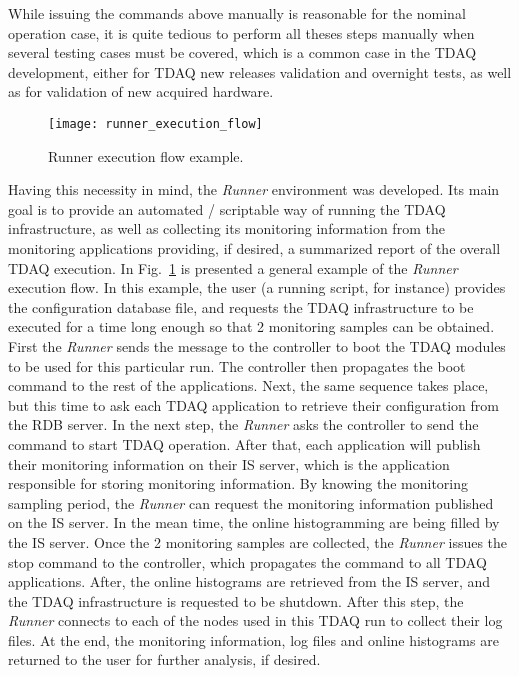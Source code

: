 While issuing the commands above manually is reasonable for the nominal operation case, it is quite tedious to perform all theses steps manually when several testing cases must be covered, which is a common case in the TDAQ development, either for TDAQ new releases validation and overnight tests, as well as for validation of new acquired hardware.

\begin{figure}
\begin{center}
\texttt{[image: runner\_execution\_flow]}
\end{center}
\caption{Runner execution flow example.}
\label{fig:runner_exec_flow}
\end{figure}

Having this necessity in mind, the \emph{Runner} environment was developed. Its main goal is to provide an automated / scriptable way of running the TDAQ infrastructure, as well as collecting its monitoring information from the monitoring applications providing, if desired, a summarized report of the overall TDAQ execution. In Fig.~\ref{fig:runner_exec_flow} is presented a general example of the \emph{Runner} execution flow. In this example, the user (a running script, for instance) provides the configuration database file, and requests the TDAQ infrastructure to be executed for a time long enough so that 2 monitoring samples can be obtained. First the \emph{Runner} sends the message to the controller to boot the TDAQ modules to be used for this particular run. The controller then propagates the boot command to the rest of the applications. Next, the same sequence takes place, but this time to ask each TDAQ application to retrieve their configuration from the RDB server. In the next step, the \emph{Runner} asks the controller to send the command to start TDAQ operation. After that, each application will publish their monitoring information on their IS server, which is the application responsible for storing monitoring information. By knowing the monitoring sampling period, the \emph{Runner} can request the monitoring information published on the IS server. In the mean time, the online histogramming are being filled by the IS server. Once the 2 monitoring samples are collected, the \emph{Runner} issues the stop command to the controller, which propagates the command to all TDAQ applications. After, the online histograms are retrieved from the IS server, and the TDAQ infrastructure is requested to be shutdown. After this step, the \emph{Runner} connects to each of the nodes used in this TDAQ run to collect their log files. At the end, the monitoring information, log files and online histograms are returned to the user for further analysis, if desired.

